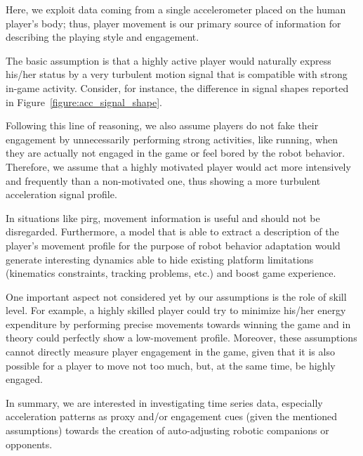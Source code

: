 Here, we exploit data coming from a single accelerometer placed on the human player's body; thus, player movement is our primary source of information for describing the playing style and engagement. 

The basic assumption is that a highly active player would naturally express his/her status by a very turbulent motion signal that is compatible with strong in-game activity. Consider, for instance, the difference in signal shapes reported in Figure~\ref{figure:acc_signal_shape}.

Following this line of reasoning, we also assume players do not fake their engagement by unnecessarily performing strong activities, like running, when they are actually not engaged in the game or feel bored by the robot behavior. Therefore, we assume that a highly motivated player would act more intensively and frequently than a non-motivated one, thus showing a more turbulent acceleration signal profile.

In situations like \gls{pirg}, movement information is useful and should not be disregarded. Furthermore, a model that is able to extract a description of the player's movement profile for the purpose of robot behavior adaptation would generate interesting dynamics able to hide existing platform limitations (kinematics constraints, tracking problems, etc.) and boost game experience.

One important aspect not considered yet by our assumptions is the role of skill level. For example, a highly skilled player could try to minimize his/her energy expenditure by performing precise movements towards winning the game and in theory could perfectly show a low-movement profile. Moreover, these assumptions cannot directly measure player engagement in the game, given that it is also possible for a player to move not too much, but, at the same time, be highly engaged. 

In summary, we are interested in investigating time series data, especially acceleration patterns as proxy and/or engagement cues (given the mentioned assumptions) towards the creation of auto-adjusting robotic companions or opponents.


